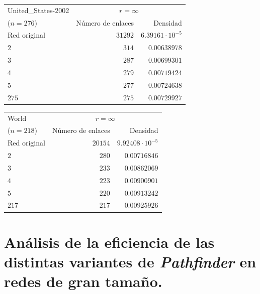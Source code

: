 \documentclass[10pt,a4paper,spanish]{article}
\numberwithin{equation}{section} %
\numberwithin{figure}{section} %
\numberwithin{table}{section} %
\begin{document}
\begin{tabular}{lrr}
\hline
 United\_States-2002 & \multicolumn{2}{c}{$r = \infty$} \\
($n=276$)   &   Número de enlaces &    Densidad \\
\hline
 Red original                     &               $31292$ & $6.39161 \cdot 10^{-5}$ \\
 $2$                                &                 $314$ & $0.00638978$  \\
 $3$                                &                 $287$ & $0.00699301$  \\
 $4$                                &                 $279$ & $0.00719424$  \\
 $5$                                &                 $277$ & $0.00724638$  \\
 $275$                              &                 $275$ & $0.00729927$  \\
\hline
\end{tabular}


\begin{tabular}{lrr}
\hline
 World & \multicolumn{2}{c}{$r = \infty$} \\
($n=218$)   &   Número de enlaces &    Densidad \\
\hline
 Red original        &               $20154$ & $9.92408 \cdot 10^{-5}$ \\
 $2$                   &                 $280$ & $0.00716846$  \\
 $3$                   &                 $233$ & $0.00862069$  \\
 $4$                   &                 $223$ & $0.00900901$  \\
 $5$                   &                 $220$ & $0.00913242$  \\
 $217$                 &                 $217$ & $0.00925926$  \\
\hline
\end{tabular}


\section{Análisis de la eficiencia de las distintas variantes de \textit{Pathfinder} en redes de gran tamaño.}
\end{document}
